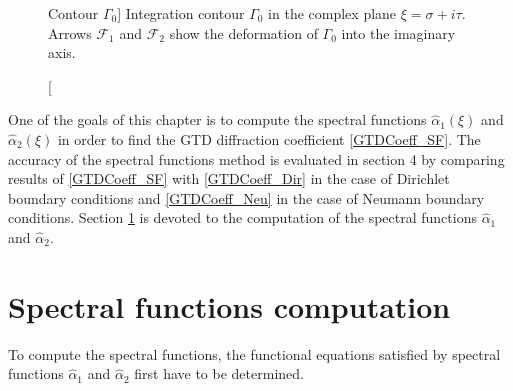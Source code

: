 \begin{figure}[ht]%
	\centering
\caption
[Contour $\Gamma_0$]
{Integration contour $\Gamma_0$ in the complex plane $\xi = \sigma + i \tau$. Arrows $\mathcal{F}_1$ and $\mathcal{F}_2$ show the deformation of $\Gamma_0$ into the imaginary axis.}
\label{chapter5:figure2}
\end{figure}

One of the goals of this chapter is to compute the spectral functions $\hat{\alpha}_1(\xi)$ and $\hat{\alpha}_2(\xi)$ in order to find the GTD diffraction coefficient \eqref{GTDCoeff_SF}. The accuracy of the spectral functions method is evaluated in section 4 by comparing results of \eqref{GTDCoeff_SF} with \eqref{GTDCoeff_Dir} in the case of Dirichlet boundary conditions and \eqref{GTDCoeff_Neu} in the case of Neumann boundary conditions. Section \ref{Chapter5:resolution} is devoted to the computation of the spectral functions $\hat{\alpha}_1$ and $\hat{\alpha}_2$.


\section{Spectral functions computation}
\label{Chapter5:resolution}

To compute the spectral functions, the functional equations satisfied by spectral functions $\hat{\alpha}_1$ and $\hat{\alpha}_2$ first have to be determined.

